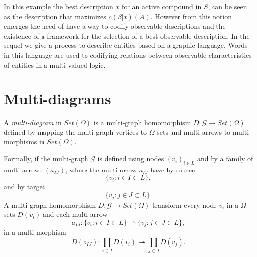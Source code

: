 \documentclass[oribibl]{llncs}
\newcommand{\G}{\mathcal{G}}
\begin{document}
In this example the best description $\bar{x}$ for an active compound in $S$, can be seen as the description that maximizes $c(\beta|\bar{x})(A)$. However from this notion emerges the need of have a way to codify observable descriptions and the existence of a framework for the selection of a best observable description. In the sequel we give a process to describe entities based on a graphic language. Words in this language are used to codifying relations between observable characteristics of entities in a multi-valued logic.


\section{Multi-diagrams}\label{multidiagrams}

A \emph{multi-diagram} in $Set(\Omega)$ is a multi-graph homomorphism $D:\G\rightarrow Set(\Omega)$ defined by mapping the multi-graph vertices to $\Omega$-sets and multi-arrows to multi-morphisms in $Set(\Omega)$.

Formally, if the multi-graph $\G$ is defined using nodes $(v_i)_{i\in L}$ and by a family of multi-arrows $(a_{IJ})$, where the multi-arrow $a_{IJ}$ have by source \[\{v_i:i\in I\subset L\},\] and by target \[\{v_j:j\in J\subset L\}.\] A multi-graph homomorphism $D:\G\rightarrow Set(\Omega)$ transform every node $v_i$ in a $\Omega$-sets $D(v_i)$ and each multi-arrow  \[a_{IJ}:\{v_i:i\in I\subset L\}\rightharpoonup\{v_j:j\in J\subset L\},\] in a multi-morphism \[D(a_{IJ}):\prod_{i\in I}D(v_i)\rightharpoonup\prod_{j\in J}D(v_j).\]
\end{document}
